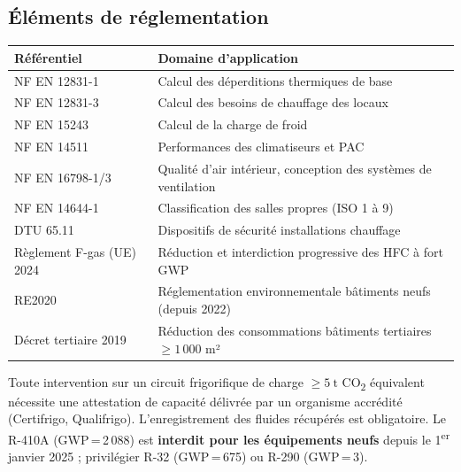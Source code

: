 \subsection{Éléments de réglementation}

\begin{center}
\begin{tabular}{lp{8cm}}
  \toprule
  Référentiel & Domaine d'application \\
  \midrule
  NF EN 12831-1 & Calcul des déperditions thermiques de base \\
  NF EN 12831-3 & Calcul des besoins de chauffage des locaux \\
  NF EN 15243 & Calcul de la charge de froid \\
  NF EN 14511 & Performances des climatiseurs et PAC \\
  NF EN 16798-1/3 & Qualité d'air intérieur, conception des systèmes de ventilation \\
  NF EN 14644-1 & Classification des salles propres (ISO 1 à 9) \\
  DTU 65.11 & Dispositifs de sécurité installations chauffage \\
  Règlement F-gas (UE) 2024 & Réduction et interdiction progressive des HFC à fort GWP \\
  RE2020 & Réglementation environnementale bâtiments neufs (depuis 2022) \\
  Décret tertiaire 2019 & Réduction des consommations bâtiments tertiaires $\geq 1\,000$ m² \\
  \bottomrule
\end{tabular}
\end{center}

\begin{attention}
  Toute intervention sur un circuit frigorifique de charge $\geq \SI{5}{\tonne}$ CO\textsubscript{2}
  équivalent nécessite une attestation de capacité délivrée par un organisme accrédité
  (Certifrigo, Qualifrigo). L'enregistrement des fluides récupérés est obligatoire.
  Le R-410A (GWP\,=\,2\,088) est \textbf{interdit pour les équipements neufs} depuis le
  1\textsuperscript{er} janvier 2025 ; privilégier R-32 (GWP\,=\,675) ou R-290 (GWP\,=\,3).
\end{attention}

\finchapitre
